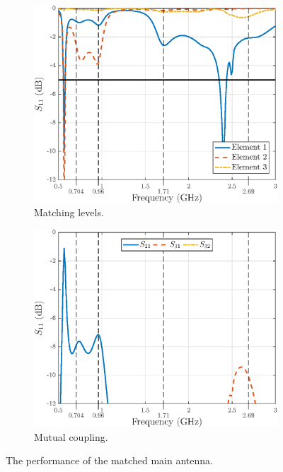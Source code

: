 \begin{figure}[H]
    \centering
    \begin{subfigure}[b]{0.49\textwidth}
        \includegraphics[width=\textwidth]{img/main_final_res_match.eps}
        \caption{Matching levels.}
        \label{fig:main_final_res_match}
    \end{subfigure}
    \begin{subfigure}[b]{0.49\textwidth}
        \includegraphics[width=\textwidth]{img/main_final_res_match_coup.eps}
        \caption{Mutual coupling.}
        \label{fig:main_final_res_match_coup}
    \end{subfigure}
    \caption{The performance of the matched main antenna.}
\end{figure}


